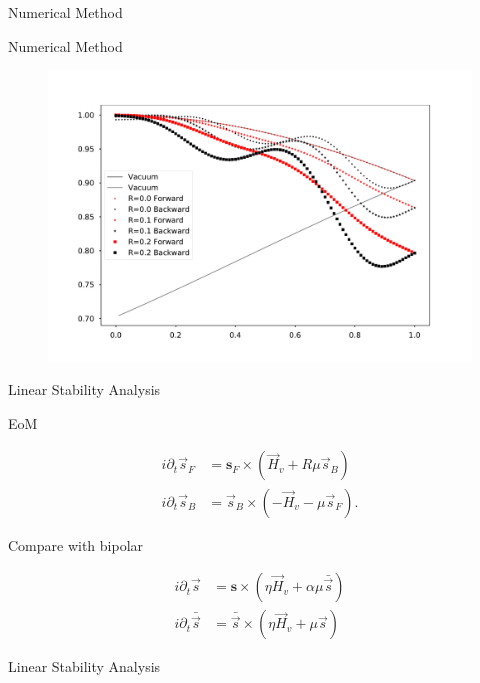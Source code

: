 \documentclass[9pt]{beamer}
\begin{document}
\begin{darkframes}
\begin{frame}{Numerical Method}
\end{frame}


\begin{frame}{Numerical Method}

\begin{tcolorbox}
   \begin{figure}
      \includegraphics[width=\textwidth]{assets/halo-mu-4-r-multiple}
   \end{figure}
\end{tcolorbox}

\end{frame}

\begin{frame}{Linear Stability Analysis}

EoM

   \begin{align*}
    i \partial_t \vec s_F &= \mathbf s_F \times (\vec {H}_v +R \mu \vec s_B) \\
      i\partial_t \vec s_B &= \vec s_B \times (- \vec H_v - \mu \vec s_F) .
   \end{align*}

Compare with bipolar

\begin{align*}
    i\partial_t \vec s &= \mathbf s \times ( \eta \vec H_v + \alpha \mu \bar{\vec s} )\\
    i\partial_t \bar{\vec s} &= \bar{\vec s} \times ( \eta \vec H_v + \mu \vec s )
\end{align*}


\end{frame}


\begin{frame}{Linear Stability Analysis}



\end{frame}
\end{darkframes}
\end{document}
